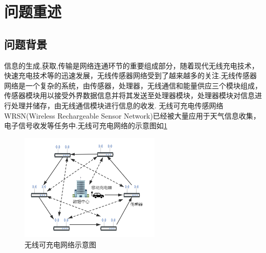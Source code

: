 \documentclass{whutmod}
\begin{document}
%
%
%
%
%

\section{问题重述}
\subsection{问题背景}

信息的生成,获取,传输是网络连通环节的重要组成部分，随着现代无线充电技术，快速充电技术等的迅速发展，无线传感器网络受到了越来越多的关注.无线传感器网络是一个复杂的系统，由传感器，处理器，无线通信和能量供应三个模块组成，传感器模块用以接受外界数据信息并将其发送至处理器模块，处理器模块对信息进行处理并储存，由无线通信模块进行信息的收发.
无线可充电传感网络WRSN(Wireless Rechargeable Sensor Network)已经被大量应用于天气信息收集，电子信号收发等任务中.无线可充电网络的示意图如\ref{示意图}
\begin{figure}[!htbp]
	\centering
	\includegraphics[width=0.6\textwidth]{系统示意图.png}
	\caption{无线可充电网络示意图}
	\label{示意图}
\end{figure} 
\end{document}
